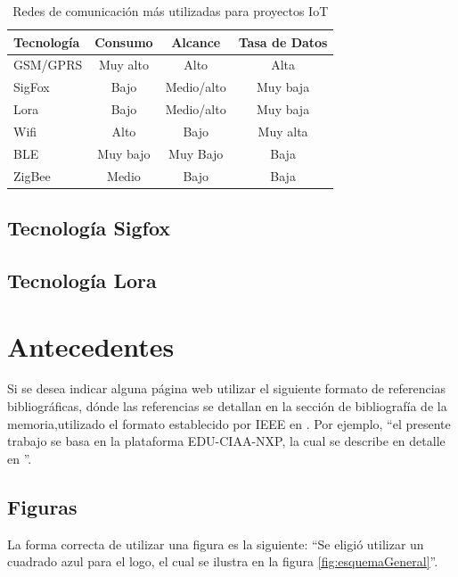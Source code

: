 \begin{table}[h]
	\centering
	\caption[caption corto]{Redes de comunicación más utilizadas para proyectos IoT}
	\begin{tabular}{l c c c}    
		\toprule
		\textbf{Tecnología} 	 & \textbf{Consumo}  & \textbf{Alcance} 	& \textbf{Tasa de Datos} \\
		\midrule
		GSM/GPRS				 & Muy alto			& Alto					&	Alta \\		
		SigFox					 & Bajo				& Medio/alto			&	Muy baja \\
		Lora					 & Bajo				& Medio/alto			&	Muy baja\\	
		Wifi					 & Alto				& Bajo					&	Muy alta \\
		BLE					 	 & Muy bajo			& Muy Bajo				&	Baja \\
		ZigBee					 & Medio			& Bajo					&	Baja \\	
		\bottomrule
		\hline
	\end{tabular}
	\label{tab:Tecno}
\end{table}


\subsection{Tecnología Sigfox}

\subsection{Tecnología Lora}

\section{Antecedentes}

Si se desea indicar alguna página web utilizar el siguiente formato de referencias bibliográficas, dónde las referencias se detallan en la sección de bibliografía de la memoria,utilizado el formato establecido por IEEE en \citep{IEEE:citation}. Por ejemplo, ``el presente trabajo se basa en la plataforma EDU-CIAA-NXP, la cual se describe en detalle en \citep{CIAA}''.

\subsection{Figuras} 

La forma correcta de utilizar una figura es la siguiente: ``Se eligió utilizar un cuadrado azul para el logo, el cual se ilustra en la figura \ref{fig:esquemaGeneral}''.

